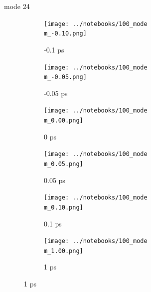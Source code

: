 \documentclass{beamer}
\newcommand\w{0.32}
\begin{document}
\renewcommand\m{24}
\begin{frame}{mode \m}
	\begin{figure}
		\centering
		\begin{subfigure}[b]{\w\textwidth}
			\centering
			\texttt{[image: ../notebooks/100\_mode\\m\_-0.10.png]}
			\caption{-0.1 ps}
		\end{subfigure}
		\begin{subfigure}[b]{\w\textwidth}
			\centering
			\texttt{[image: ../notebooks/100\_mode\\m\_-0.05.png]}
			\caption{-0.05 ps}
		\end{subfigure}
		\begin{subfigure}[b]{\w\textwidth}
			\centering
			\texttt{[image: ../notebooks/100\_mode\\m\_0.00.png]}
			\caption{0 ps}
		\end{subfigure}
		\begin{subfigure}[b]{\w\textwidth}
			\centering
			\texttt{[image: ../notebooks/100\_mode\\m\_0.05.png]}
			\caption{0.05 ps}
		\end{subfigure}
		\begin{subfigure}[b]{\w\textwidth}
			\centering
			\texttt{[image: ../notebooks/100\_mode\\m\_0.10.png]}
			\caption{0.1 ps}
		\end{subfigure}
		\begin{subfigure}[b]{\w\textwidth}
			\centering
			\texttt{[image: ../notebooks/100\_mode\\m\_1.00.png]}
			\caption{1 ps}
		\end{subfigure}
	\end{figure}
\end{frame}
\end{document}

